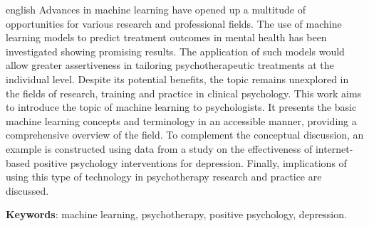 \documentclass[
	12pt,				        %
	openany,			        %
	oneside,			        %
	a4paper,			        %
	english,			        %
	brazil				        %
	]{abntex2}
\newcommand{\listofquadrosname}{Lista de quadros}
\begin{document}
\begin{resumo}[Abstract]
 \begin{otherlanguage*}{english}
   Advances in machine learning have opened up a multitude of opportunities for various research and professional fields. The use of machine learning models to
   predict treatment outcomes in mental health has been investigated showing promising results. The application of such models would allow greater assertiveness
   in tailoring psychotherapeutic treatments at the individual level. Despite its potential benefits, the topic remains unexplored in the fields of research, training
   and practice in clinical psychology. This work aims to introduce the topic of machine learning to psychologists. It presents the basic machine learning concepts and
   terminology in an accessible manner, providing a comprehensive overview of the field. To complement the conceptual discussion, an example is constructed using data
   from a study on the effectiveness of internet-based positive psychology interventions for depression. Finally, implications of using this type of technology in
   psychotherapy research and practice are discussed.
   \vspace{\onelineskip}
 
   \noindent 
   \textbf{Keywords}: machine learning, psychotherapy, positive psychology, depression.
 \end{otherlanguage*}
\end{resumo}


\listoffigures*
\cleardoublepage








\end{document}
